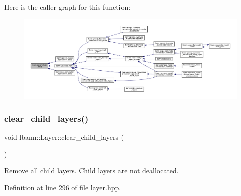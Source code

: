 Here is the caller graph for this function\+:\nopagebreak
\begin{figure}[H]
\begin{center}
\leavevmode
\includegraphics[width=350pt]{classlbann_1_1Layer_aeec1c710c3d53b5e43a4d4f67b0a21b2_icgraph}
\end{center}
\end{figure}
\mbox{\label{classlbann_1_1Layer_a040bf53e261b1ef796739c09b3362a3a}} 
\subsubsection{\texorpdfstring{clear\+\_\+child\+\_\+layers()}{clear\_child\_layers()}}
{\footnotesize\ttfamily void lbann\+::\+Layer\+::clear\+\_\+child\+\_\+layers (\begin{DoxyParamCaption}{ }\end{DoxyParamCaption})\hspace{0.3cm}{\ttfamily [inline]}}

Remove all child layers. Child layers are not deallocated. 

Definition at line 296 of file layer.\+hpp.



